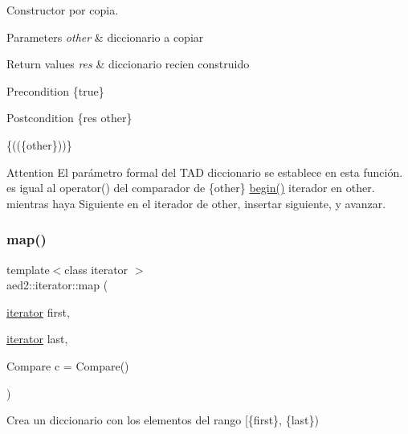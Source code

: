 Constructor por copia. 


\begin{DoxyParams}{Parameters}
{\em other} & diccionario a copiar \\
\hline
\end{DoxyParams}

\begin{DoxyRetVals}{Return values}
{\em res} & diccionario recien construido\\
\hline
\end{DoxyRetVals}
\begin{DoxyPrecond}{Precondition}
\{true\} 
\end{DoxyPrecond}
\begin{DoxyPostcond}{Postcondition}
\{res  other\}
\end{DoxyPostcond}
\{((\{other\}))\}

\begin{DoxyAttention}{Attention}
El parámetro formal  del T\+AD diccionario se establece en esta función.  es igual al operator() del comparador de \{other\} \hyperlink{classaed2_1_1iterator_af8901de173468531c58458b581d345a6}{begin()} iterador en other. mientras haya Siguiente en el iterador de other, insertar siguiente, y avanzar. 
\end{DoxyAttention}
\mbox{\label{classaed2_1_1iterator_aa44ca788a300603c5fae2d192e11f249}} 
\subsubsection{\texorpdfstring{map()}{map()}\hspace{0.1cm}{\footnotesize\ttfamily [3/3]}}
{\footnotesize\ttfamily template$<$class iterator $>$ \\
aed2\+::iterator\+::map (\begin{DoxyParamCaption}\item[{\hyperlink{classaed2_1_1iterator_1_1iterator}{iterator}}]{first,  }\item[{\hyperlink{classaed2_1_1iterator_1_1iterator}{iterator}}]{last,  }\item[{Compare}]{c = {\ttfamily Compare()} }\end{DoxyParamCaption})\hspace{0.3cm}{\ttfamily [inline]}}



Crea un diccionario con los elementos del rango \mbox{[}\{first\}, \{last\}) 


